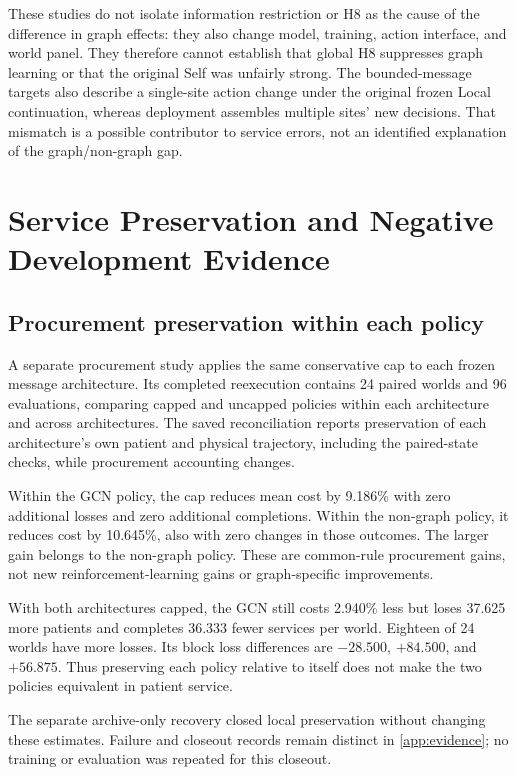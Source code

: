 \documentclass[preprint,12pt]{elsarticle}
\begin{document}
These studies do not isolate information restriction or H8 as the cause of
the difference in graph effects: they also change model, training, action
interface, and world panel. They therefore cannot establish that global H8
suppresses graph learning or that the original Self was unfairly strong.
The bounded-message targets also describe a single-site action change under
the original frozen Local continuation, whereas deployment assembles multiple
sites' new decisions. That mismatch is a possible contributor to service
errors, not an identified explanation of the graph/non-graph gap.

\section{Service Preservation and Negative Development Evidence}
\subsection{Procurement preservation within each policy}
A separate procurement study applies the same conservative cap to each frozen
message architecture. Its completed reexecution contains 24 paired worlds and
96 evaluations, comparing capped and uncapped policies within each architecture
and across architectures. The saved reconciliation reports preservation of each
architecture's own patient and physical trajectory, including the paired-state
checks, while procurement accounting changes.

Within the GCN policy, the cap reduces mean cost by 9.186\% with zero additional
losses and zero additional completions. Within the non-graph policy, it reduces
cost by 10.645\%, also with zero changes in those outcomes. The larger gain
belongs to the non-graph policy. These are common-rule procurement gains,
not new reinforcement-learning gains or graph-specific improvements.

With both architectures capped, the GCN still costs 2.940\% less but loses
37.625 more patients and completes 36.333 fewer services per world. Eighteen of
24 worlds have more losses. Its block loss differences are $-28.500$,
$+84.500$, and $+56.875$. Thus preserving each policy relative to itself does
not make the two policies equivalent in patient service.

The separate archive-only recovery closed local preservation without changing
these estimates. Failure and closeout records remain distinct in
\ref{app:evidence}; no training or evaluation was repeated for this closeout.
\end{document}
